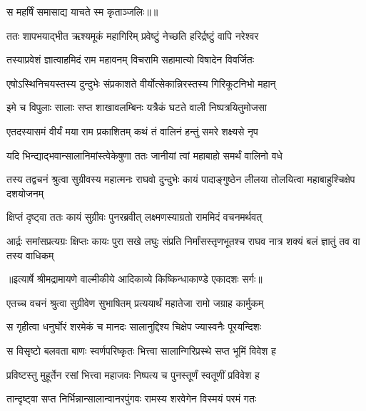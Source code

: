 {स महर्षिं समासाद्य याचते स्म कृताञ्जलिः॥॥} %

\addtocounter{shlokacount}{1}

\twolineshloka
{ततः शापभयाद्भीत ऋश्यमूकं महागिरिम्}
{प्रवेष्टुं नेच्छति हरिर्द्रष्टुं वापि नरेश्वर} %

\twolineshloka
{तस्याप्रवेशं ज्ञात्वाहमिदं राम महावनम्}
{विचरामि सहामात्यो विषादेन विवर्जितः} %

\twolineshloka
{एषोऽस्थिनिचयस्तस्य दुन्दुभेः संप्रकाशते}
{वीर्योत्सेकान्निरस्तस्य गिरिकूटनिभो महान्} %

\twolineshloka
{इमे च विपुलाः सालाः सप्त शाखावलम्बिनः}
{यत्रैकं घटते वाली निष्पत्रयितुमोजसा} %

\twolineshloka
{एतदस्यासमं वीर्यं मया राम प्रकाशितम्}
{कथं तं वालिनं हन्तुं समरे शक्ष्यसे नृप} %

\twolineshloka
{यदि भिन्द्याद्भवान्सालानिमांस्त्वेकेषुणा ततः}
{जानीयां त्वां महाबाहो समर्थं वालिनो वधे} %

\threelineshloka
{तस्य तद्वचनं श्रुत्वा सुग्रीवस्य महात्मनः}
{राघवो दुन्दुभेः कायं पादाङ्गुष्ठेन लीलया}
{तोलयित्वा महाबाहुश्चिक्षेप दशयोजनम्} %

\twolineshloka
{क्षिप्तं दृष्ट्वा ततः कायं सुग्रीवः पुनरब्रवीत्}
{लक्ष्मणस्याग्रतो राममिदं वचनमर्थवत्} %

\threelineshloka
{आर्द्रः समांसप्रत्यग्रः क्षिप्तः कायः पुरा सखे}
{लघुः संप्रति निर्मांसस्तृणभूतश्च राघव}
{नात्र शक्यं बलं ज्ञातुं तव वा तस्य वाधिकम्} %


{॥इत्यार्षे श्रीमद्रामायणे वाल्मीकीये आदिकाव्ये किष्किन्धाकाण्डे एकादशः सर्गः॥}


\twolineshloka
{एतच्च वचनं श्रुत्वा सुग्रीवेण सुभाषितम्}
{प्रत्ययार्थं महातेजा रामो जग्राह कार्मुकम्} %

\twolineshloka
{स गृहीत्वा धनुर्घोरं शरमेकं च मानदः}
{सालानुद्दिश्य चिक्षेप ज्यास्वनैः पूरयन्दिशः} %

\twolineshloka
{स विसृष्टो बलवता बाणः स्वर्णपरिष्कृतः}
{भित्त्वा सालान्गिरिप्रस्थे सप्त भूमिं विवेश ह} %

\twolineshloka
{प्रविष्टस्तु मुहूर्तेन रसां भित्त्वा महाजवः}
{निष्पत्य च पुनस्तूर्णं स्वतूणीं प्रविवेश ह} %

\twolineshloka
{तान्दृष्ट्वा सप्त निर्भिन्नान्सालान्वानरपुंगवः}
{रामस्य शरवेगेन विस्मयं परमं गतः} %

